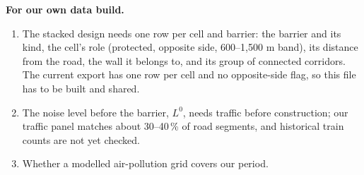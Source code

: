 \documentclass[11pt]{article}
\begin{document}
\textbf{For our own data build.}
\begin{enumerate}
\item The stacked design needs one row per cell and barrier: the barrier and its kind, the cell's role (protected, opposite side, 600--1,500 m band), its distance from the road, the wall it belongs to, and its group of connected corridors. The current export has one row per cell and no opposite-side flag, so this file has to be built and shared.
\item The noise level before the barrier, \(L^0\), needs traffic before construction; our traffic panel matches about 30--40\,\% of road segments, and historical train counts are not yet checked.
\item Whether a modelled air-pollution grid covers our period.
\end{enumerate}

\printbibliography[title={References}]
\end{document}
